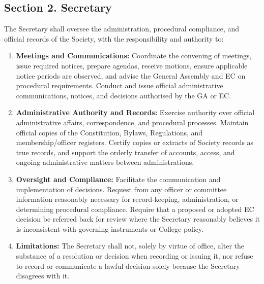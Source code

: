 \documentclass[a4paper]{article}
\begin{document}
\subsection*{Section 2. Secretary}
The Secretary shall oversee the administration, procedural compliance, and official records of the Society, with the responsibility and authority to:
\begin{enumerate}
  \item \textbf{Meetings and Communications:} Coordinate the convening of meetings, issue required notices, prepare agendas, receive motions, ensure applicable notice periods are observed, and advise the General Assembly and EC on procedural requirements. Conduct and issue official administrative communications, notices, and decisions authorised by the GA or EC.
  \item \textbf{Administrative Authority and Records:} Exercise authority over official administrative affairs, correspondence, and procedural processes. Maintain official copies of the Constitution, Bylaws, Regulations, and membership/officer registers. Certify copies or extracts of Society records as true records, and support the orderly transfer of accounts, access, and ongoing administrative matters between administrations.
  \item \textbf{Oversight and Compliance:} Facilitate the communication and implementation of decisions. Request from any officer or committee information reasonably necessary for record-keeping, administration, or determining procedural compliance. Require that a proposed or adopted EC decision be referred back for review where the Secretary reasonably believes it is inconsistent with governing instruments or College policy.
  \item \textbf{Limitations:} The Secretary shall not, solely by virtue of office, alter the substance of a resolution or decision when recording or issuing it, nor refuse to record or communicate a lawful decision solely because the Secretary disagrees with it.
\end{enumerate}
\end{document}
